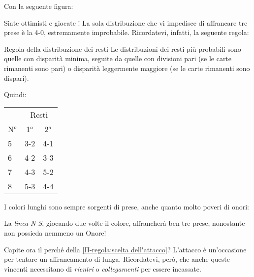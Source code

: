 \documentclass[../corsofiori.tex]{subfiles}
\begin{document}
Con la seguente figura:


Siate ottimisti e giocate ! La sola distribuzione che vi impedisce di affrancare tre prese è la 4-0,
estremamente improbabile. Ricordatevi, infatti, la seguente regola:

\medskip

\begin{regola}{Regola della distribuzione dei resti}
    Le distribuzioni dei resti più probabili sono quelle con disparità minima, seguite da quelle con divisioni pari (se
    le carte rimanenti sono pari) o disparità leggermente maggiore (se le carte rimanenti sono dispari).
\end{regola}
\medskip

    Quindi:
    \begin{center}
    \begin{tabular}{lcc}
        \toprule
        & \multicolumn{2}{c}{Resti}\\
        \cmidrule(l){2-3}
        N°& 1$^a$ & 2$^a$ \\
        \midrule
        5 & 3-2 & 4-1\\
        6 & 4-2 & 3-3\\
        7 & 4-3 & 5-2\\
        8 & 5-3 & 4-4\\
    \end{tabular}


    \end{center}

\medskip

I colori lunghi sono sempre sorgenti di prese, anche quanto molto poveri di onori:

\begin{wraptable}[6]{l}[0cm]{3cm}


\end{wraptable}

La \emph{linea N-S}, giocando due volte il colore,
affrancherà ben tre prese, nonostante non possieda nemmeno un Onore!

Capite ora il perché della \autoref{II-regola:scelta dell'attacco}? L'attacco è un'occasione per tentare un affrancamento di lunga.
Ricordatevi, però, che anche queste vincenti necessitano di \emph{rientri} o \emph{collegamenti} per essere incassate.
\end{document}
